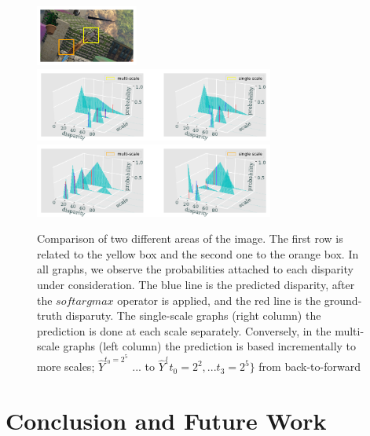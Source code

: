 \documentclass[runningheads]{llncs}
\begin{document}
\begin{figure}[htb!]
    \begin{center}
        \includegraphics[width=0.3\textwidth]{paper/latex/figures/multiscale_importance_image_patches.pdf}\\
        \includegraphics[width=0.7\textwidth]{paper/latex/figures/multiscale_importance_graph_high_resolution.pdf}\\
        \includegraphics[width=0.7\textwidth]{figures/multiscale_importance_graph_low_resolution.pdf}
    \end{center}
    
    \caption{Comparison of two different areas of the image. The first row is related to the yellow box and the second one to the orange box. In all graphs, we observe the probabilities attached to each disparity under consideration. The blue line is the predicted disparity, after the $softargmax$ operator is applied, and the red line is the ground-truth disparuty. The single-scale graphs (right column) the prediction is done at each scale separately. Conversely, in the multi-scale graphs (left column) the prediction is based incrementally to more scales; $\hat{Y}^{t_0 = 2^5}$ ... to $\hat{Y}^\{t_0=2^2, ... t_3 = 2^5\}$ from back-to-forward}
    \label{fig:multiscale_importance}
\end{figure}


\section{Conclusion and Future Work}
\end{document}
